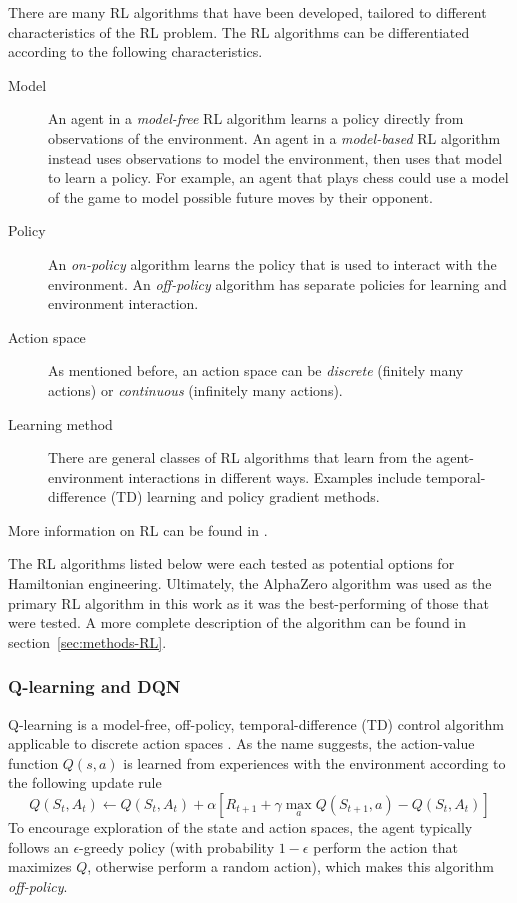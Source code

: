 There are many RL algorithms that have been developed, tailored to different characteristics of the RL problem. The RL algorithms can be differentiated according to the following characteristics.
\begin{description}
    \item[Model] An agent in a \emph{model-free} RL algorithm learns a policy directly from observations of the environment. An agent in a \emph{model-based} RL algorithm instead uses observations to model the environment, then uses that model to learn a policy. For example, an agent that plays chess could use a model of the game to model possible future moves by their opponent.
    \item[Policy] An \emph{on-policy} algorithm learns the policy that is used to interact with the environment. An \emph{off-policy} algorithm has separate policies for learning and environment interaction.
    \item[Action space] As mentioned before, an action space can be \emph{discrete} (finitely many actions) or \emph{continuous} (infinitely many actions).
    \item[Learning method] There are general classes of RL algorithms that learn from the agent-environment interactions in different ways. Examples include temporal-difference (TD) learning and policy gradient methods.
\end{description}
More information on RL can be found in \cite{sutton2018reinforcement}.

The RL algorithms listed below were each tested as potential options for Hamiltonian engineering. Ultimately, the AlphaZero algorithm was used as the primary RL algorithm in this work as it was the best-performing of those that were tested. A more complete description of the algorithm can be found in section~\ref{sec:methods-RL}.

\subsubsection{Q-learning and DQN}

Q-learning is a model-free, off-policy, temporal-difference (TD) control algorithm applicable to discrete action spaces \cite{watkins1989learning}. As the name suggests, the action-value function $Q(s,a)$ is learned from experiences with the environment according to the following update rule
\begin{equation}\label{eq:Q_learning_update}
    Q(S_t, A_t) \leftarrow Q(S_t, A_t) +
        \alpha \left[ R_{t+1} + \gamma \max_a Q(S_{t+1}, a) - Q(S_t, A_t) \right]
\end{equation}
To encourage exploration of the state and action spaces, the agent typically follows an $\epsilon$-greedy policy (with probability $1-\epsilon$ perform the action that maximizes $Q$, otherwise perform a random action), which makes this algorithm \emph{off-policy}.

